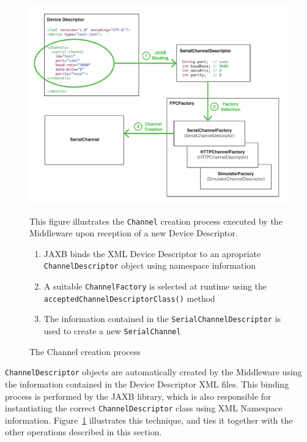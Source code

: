 \begin{figure}[!hbt]
\includegraphics[width=\textwidth]{imgs/channel_creation_process.pdf}
\caption{The Channel creation process}
\label{fig:channel.creation}
{
\begin{figurenote}
This figure illustrates the \texttt{Channel} creation process executed by the
Middleware upon reception of a new Device Descriptor.  \begin{enumerate}
  \itemsep0em
  \item JAXB binds the XML Device Descriptor to an apropriate
\texttt{ChannelDescriptor} object using namespace information \item A suitable
\texttt{ChannelFactory} is selected at runtime using the
\texttt{acceptedChannelDescriptorClass()} method
  \item The information contained in the \texttt{SerialChannelDescriptor} is
used to create a new \texttt{SerialChannel} \end{enumerate}
\end{figurenote}
}
\end{figure}

\texttt{ChannelDescriptor} objects are automatically created by the
Middleware using the information contained in the Device Descriptor XML files.
This binding process is performed by the JAXB library, which is also
responsible for instantiating the correct \texttt{ChannelDescriptor} class
using XML Namespace information. Figure~\ref{fig:channel.creation} illustrates
this technique, and ties it together with the other operations described in
this section.

